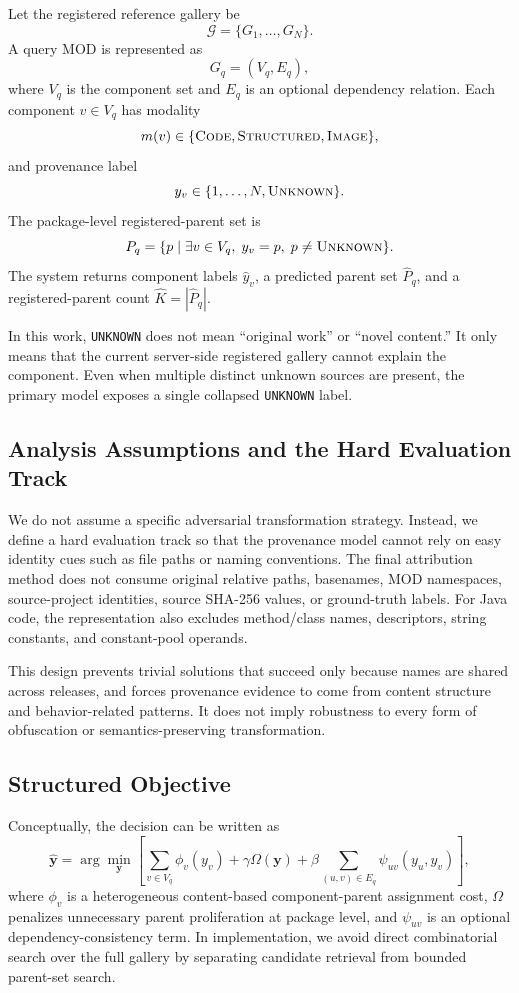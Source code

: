 \documentclass[runningheads]{llncs}
\begin{document}
Let the registered reference gallery be
\[
\mathcal{G}=\{G_1,\ldots,G_N\}.
\]
A query MOD is represented as
\[
G_q=(V_q,E_q),
\]
where $V_q$ is the component set and $E_q$ is an optional dependency relation. Each component $v\in V_q$ has modality
\[
m(v)\in\{\textsc{Code},\textsc{Structured},\textsc{Image}\},
\]
and provenance label
\[
y_v\in\{1,\ldots,N,\textsc{Unknown}\}.
\]
The package-level registered-parent set is
\[
P_q=\{p\mid \exists v\in V_q,\; y_v=p,\;p\neq\textsc{Unknown}\}.
\]
The system returns component labels $\hat y_v$, a predicted parent set $\hat P_q$, and a registered-parent count $\hat K=|\hat P_q|$.

In this work, \texttt{UNKNOWN} does not mean ``original work'' or ``novel content.'' It only means that the current server-side registered gallery cannot explain the component. Even when multiple distinct unknown sources are present, the primary model exposes a single collapsed \texttt{UNKNOWN} label.

\subsection{Analysis Assumptions and the Hard Evaluation Track}

We do not assume a specific adversarial transformation strategy. Instead, we define a hard evaluation track so that the provenance model cannot rely on easy identity cues such as file paths or naming conventions. The final attribution method does not consume original relative paths, basenames, MOD namespaces, source-project identities, source SHA-256 values, or ground-truth labels. For Java code, the representation also excludes method/class names, descriptors, string constants, and constant-pool operands.

This design prevents trivial solutions that succeed only because names are shared across releases, and forces provenance evidence to come from content structure and behavior-related patterns. It does not imply robustness to every form of obfuscation or semantics-preserving transformation.

\subsection{Structured Objective}

Conceptually, the decision can be written as
\[
\hat{\mathbf y}=\arg\min_{\mathbf y}
\left[
\sum_{v\in V_q}\phi_v(y_v)
+\gamma\Omega(\mathbf y)
+\beta\sum_{(u,v)\in E_q}\psi_{uv}(y_u,y_v)
\right],
\]
where $\phi_v$ is a heterogeneous content-based component-parent assignment cost, $\Omega$ penalizes unnecessary parent proliferation at package level, and $\psi_{uv}$ is an optional dependency-consistency term. In implementation, we avoid direct combinatorial search over the full gallery by separating candidate retrieval from bounded parent-set search.
\end{document}
